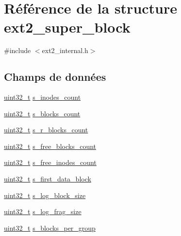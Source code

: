 \hypertarget{structext2__super__block}{\section{\-Référence de la structure ext2\-\_\-super\-\_\-block}
\label{structext2__super__block}
}


{\ttfamily \#include $<$ext2\-\_\-internal.\-h$>$}

\subsection*{\-Champs de données}
\begin{DoxyCompactItemize}
\item 
\hyperlink{types_8h_a33594304e786b158f3fb30289278f5af}{uint32\-\_\-t} \hyperlink{structext2__super__block_a2ea20f821c0ddc19b0adc7d1b8d0685d}{s\-\_\-inodes\-\_\-count}
\item 
\hyperlink{types_8h_a33594304e786b158f3fb30289278f5af}{uint32\-\_\-t} \hyperlink{structext2__super__block_a3878ffaff13c625cce6b825ecb797547}{s\-\_\-blocks\-\_\-count}
\item 
\hyperlink{types_8h_a33594304e786b158f3fb30289278f5af}{uint32\-\_\-t} \hyperlink{structext2__super__block_a660db33fc94622167793c6b080c515e4}{s\-\_\-r\-\_\-blocks\-\_\-count}
\item 
\hyperlink{types_8h_a33594304e786b158f3fb30289278f5af}{uint32\-\_\-t} \hyperlink{structext2__super__block_a005160872a0474cdc9be97da00b81b84}{s\-\_\-free\-\_\-blocks\-\_\-count}
\item 
\hyperlink{types_8h_a33594304e786b158f3fb30289278f5af}{uint32\-\_\-t} \hyperlink{structext2__super__block_aeefbe6028c7e1554805b033287de0097}{s\-\_\-free\-\_\-inodes\-\_\-count}
\item 
\hyperlink{types_8h_a33594304e786b158f3fb30289278f5af}{uint32\-\_\-t} \hyperlink{structext2__super__block_ab7c5dfba6eafbb1974f7628d4ae32601}{s\-\_\-first\-\_\-data\-\_\-block}
\item 
\hyperlink{types_8h_a33594304e786b158f3fb30289278f5af}{uint32\-\_\-t} \hyperlink{structext2__super__block_a34965ad64787db6bf0893e000b19f608}{s\-\_\-log\-\_\-block\-\_\-size}
\item 
\hyperlink{types_8h_a33594304e786b158f3fb30289278f5af}{uint32\-\_\-t} \hyperlink{structext2__super__block_a441780f5356cad879e465bb23d5c0659}{s\-\_\-log\-\_\-frag\-\_\-size}
\item 
\hyperlink{types_8h_a33594304e786b158f3fb30289278f5af}{uint32\-\_\-t} \hyperlink{structext2__super__block_a037ab0266050cd0d0026c5da1fda3ab1}{s\-\_\-blocks\-\_\-per\-\_\-group}

\end{DoxyCompactItemize}
